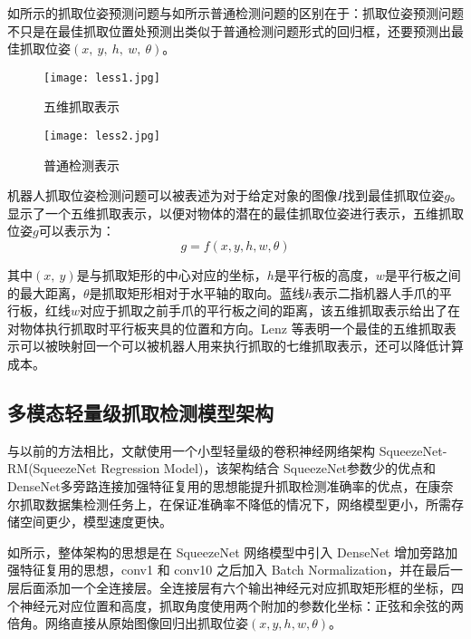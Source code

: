 \documentclass{hitszthesis}
\begin{document}
如所示的抓取位姿预测问题与如所示普通检测问题的区别在于：抓取位姿预测问题不只是在最佳抓取位置处预测出类似于普通检测问题形式的回归框，还要预测出最佳抓取位姿$(x,\ y,\ h,\ w,\ \theta)$。

\begin{figure}[!htbp]
	\centering
	\texttt{[image: less1.jpg]}
	\caption{五维抓取表示}
     \label{figless1}
\end{figure}
\begin{figure}[!htbp]
	\centering
	\texttt{[image: less2.jpg]}
	\caption{普通检测表示}
     \label{figless2}
\end{figure}

机器人抓取位姿检测问题可以被表述为对于给定对象的图像$I$找到最佳抓取位姿$g$。显示了一个五维抓取表示，以便对物体的潜在的最佳抓取位姿进行表示，五维抓取位姿$g$可以表示为：
\begin{equation}
g=f(x,y,h,w,\theta)
\label{eqgrasp}
\end{equation}

其中$(x,\ y)$是与抓取矩形的中心对应的坐标，$h$是平行板的高度，$w$是平行板之间的最大距离，$\theta$是抓取矩形相对于水平轴的取向。蓝线$h$表示二指机器人手爪的平行板，红线$w$对应于抓取之前手爪的平行板之间的距离，该五维抓取表示给出了在对物体执行抓取时平行板夹具的位置和方向。Lenz 等表明一个最佳的五维抓取表示可以被映射回一个可以被机器人用来执行抓取的七维抓取表示，还可以降低计算成本。

\subsection{多模态轻量级抓取检测模型架构}

与以前的方法相比，文献\cite{bib:one}使用一个小型轻量级的卷积神经网络架构 SqueezeNet-RM(SqueezeNet Regression Model)，该架构结合 SqueezeNet参数少的优点和 DenseNet多旁路连接加强特征复用的思想能提升抓取检测准确率的优点，在康奈尔抓取数据集检测任务上，在保证准确率不降低的情况下，网络模型更小，所需存储空间更少，模型速度更快。

如所示，整体架构的思想是在 SqueezeNet 网络模型中引入 DenseNet 增加旁路加强特征复用的思想，conv1 和 conv10 之后加入 Batch Normalization，并在最后一层后面添加一个全连接层。全连接层有六个输出神经元对应抓取矩形框的坐标，四个神经元对应位置和高度，抓取角度使用两个附加的参数化坐标：正弦和余弦的两倍角。网络直接从原始图像回归出抓取位姿$(x,y,h,w,\theta)$。
\end{document}
